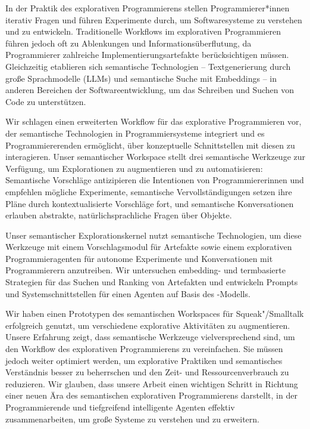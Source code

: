 \begin{zusammenfassung}
	\enlargethispage{2\baselineskip} %
	In der Praktik des explorativen Programmierens stellen Programmierer*innen iterativ Fragen und führen Experimente durch, um Softwaresysteme zu verstehen und zu entwickeln.
	Traditionelle Workflows im explorativen Programmieren führen jedoch oft zu Ablenkungen und Informationsüberflutung, da Programmierer zahlreiche Implementierungsartefakte berücksichtigen müssen.
	Gleichzeitig etablieren sich semantische Technologien -- Textgenerierung durch große Sprachmodelle (LLMs) und semantische Suche mit Embeddings -- in anderen Bereichen der Softwareentwicklung, um das Schreiben und Suchen von Code zu unterstützen.

	Wir schlagen einen erweiterten Workflow für das explorative Programmieren vor, der semantische Technologien in Programmiersysteme integriert und es Programmiererenden ermöglicht, über konzeptuelle Schnittstellen mit diesen zu interagieren.
	Unser semantischer Workspace stellt drei semantische Werkzeuge zur Verfügung, um Explorationen zu augmentieren und zu automatisieren:
	Semantische Vorschläge antizipieren die Intentionen von Programmiererinnen und empfehlen mögliche Experimente, semantische Vervollständigungen setzen ihre Pläne durch kontextualisierte Vorschläge fort, und semantische Konversationen erlauben abstrakte, natürlichsprachliche Fragen über Objekte.

	Unser semantischer Explorationskernel nutzt semantische Technologien, um diese Werkzeuge mit einem Vorschlagsmodul für Artefakte sowie einem explorativen Programmieragenten für autonome Experimente und Konversationen mit Programmierern anzutreiben.
	Wir untersuchen embedding- und termbasierte Strategien für das Suchen und Ranking von Artefakten und entwickeln Prompts und Systemschnittstellen für einen Agenten auf Basis des \gptfouro-Modells.

	Wir haben einen Prototypen des semantischen Workspaces für Squeak"/Smalltalk erfolgreich genutzt, um verschiedene explorative Aktivitäten zu augmentieren.
	Unsere Erfahrung zeigt, dass semantische Werkzeuge vielversprechend sind, um den Workflow des explorativen Programmierens zu vereinfachen.
	Sie müssen jedoch weiter optimiert werden, um explorative Praktiken und semantisches Verständnis besser zu beherrschen und den Zeit- und Ressourcenverbrauch zu reduzieren.
	Wir glauben, dass unsere Arbeit einen wichtigen Schritt in Richtung einer neuen Ära des semantischen explorativen Programmierens darstellt, in der Programmierende und tiefgreifend intelligente Agenten effektiv zusammenarbeiten, um große Systeme zu verstehen und zu erweitern.
\end{zusammenfassung}
